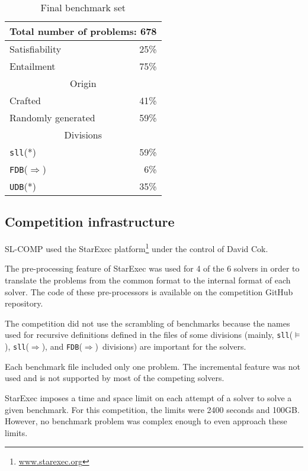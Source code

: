 \documentclass{llncs}
\newcommand{\limp}{\Rightarrow}
\newcommand{\sllsat}{\texttt{sll}($\models$)}
\newcommand{\sllent}{\texttt{sll}($\limp$)}
\newcommand{\FDBent}{\texttt{FDB}($\limp$)}
\begin{document}
\begin{table}
\begin{center}
\begin{tabular}{p{7cm}r}\hline
\multicolumn{2}{c}{Total number of problems: 678} \\
\hline
Satisfiability & 25\% \\
Entailment & 75\% \\
\hline
%
\hline
\multicolumn{2}{c}{Origin} \\
\hline
Crafted & 41\% \\
Randomly generated & 59\% \\
\hline
%
\hline
\multicolumn{2}{c}{Divisions} \\
\hline
\texttt{sll}(*) & 59\% \\
\FDBent & 6\% \\
\texttt{UDB}(*) & 35\% \\
\hline
\end{tabular}
\end{center}
\caption{Final benchmark set}
\label{tab:bench}
\end{table}



\subsection{Competition infrastructure}

SL-COMP used the StarExec platform\footnote{\url{www.starexec.org}} under the control of David Cok. 

The pre-processing feature of StarExec was used for 4 of the 6 solvers in order to translate the problems from the common format to the internal format of each solver. The code of these pre-processors is available on the competition GitHub repository.

The competition did not use the scrambling of benchmarks because the names used for recursive definitions defined in the files of some divisions (mainly, \sllsat, \sllent, and \FDBent\ divisions) are important for the solvers.

Each benchmark file included only one problem. 
The incremental feature was not used and is not supported by most of the competing solvers.

StarExec imposes a time and space limit on each attempt of a solver to solve a given benchmark. For this competition, the limits were 2400 seconds and 100GB. However, no benchmark problem was complex enough to even approach these limits.
\end{document}
